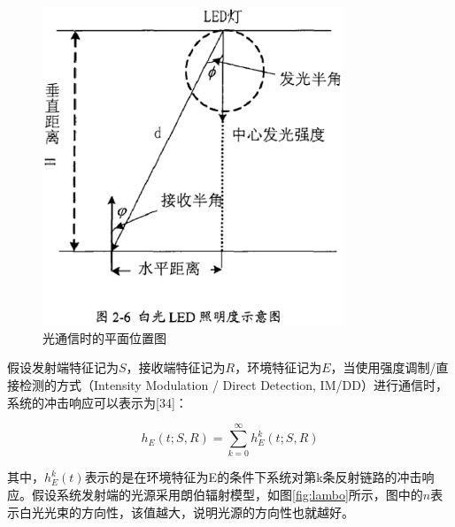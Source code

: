 \begin{figure}[htbp]
    \centering
	\includegraphics[width=0.8\textwidth]{figures/chapter-2/VlcJiHe.eps}
	\caption{光通信时的平面位置图}
	\label{fig:vlc-ji-he}
\end{figure}

假设发射端特征记为$S$，接收端特征记为$R$，环境特征记为$E$，当使用强度调制/直接检测的方式（Intensity Modulation / Direct Detection, IM/DD）进行通信时，系统的冲击响应可以表示为[34]：

\begin{equation}
    h_{E}(t;S,R) = \sum_{k=0}^\infty h_{E}^k(t;S,R)
\end{equation}

其中，$h_{E}^k(t)$表示的是在环境特征为E的条件下系统对第k条反射链路的冲击响应。假设系统发射端的光源采用朗伯辐射模型，如图\autoref{fig:lambo}所示，图中的$n$表示白光光束的方向性，该值越大，说明光源的方向性也就越好。

